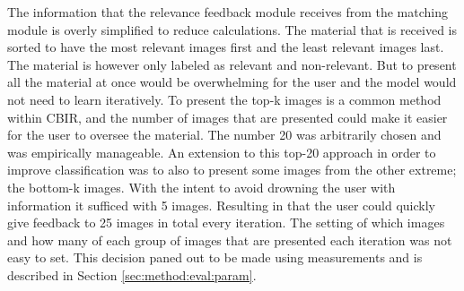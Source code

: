 The information that the relevance feedback module receives from the matching module is overly simplified to reduce calculations. The material that is received is sorted to have the most relevant images first and the least relevant images last. The material is however only labeled as relevant and non-relevant. But to present all the material at once would be overwhelming for the user and the model would not need to learn iteratively. 
To present the top-k images is a common method within CBIR, and the number of images that are presented could make it easier for the user to oversee the material. The number 20 was arbitrarily chosen and was empirically manageable. An extension to this top-20 approach in order to improve classification was to also to present some images from the other extreme; the bottom-k images. With the intent to avoid drowning the user with information it sufficed with 5 images. Resulting in that the user could quickly give feedback to 25 images in total every iteration. The setting of which images and how many of each group of images that are presented each iteration was not easy to set. This decision paned out to be  made using measurements and is described in Section \ref{sec:method:eval:param}. 
